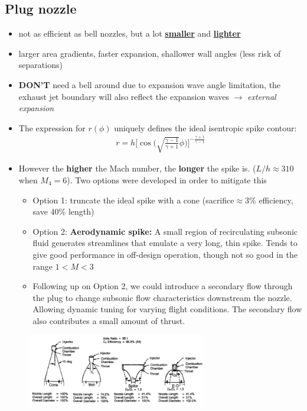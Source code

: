 \documentclass[a4paper,10pt]{article}
\begin{document}
\subsection{Plug nozzle}
\begin{itemize}
    \item not as efficient as bell nozzles, but a lot \underline{\textbf{smaller}} and \underline{\textbf{lighter}}
    \item larger area gradients, faster expansion, shallower wall angles (less risk of separations)
    \item \textbf{DON'T} need a bell around due to expansion wave angle limitation, the exhaust jet boundary will also reflect the expansion waves $\rightarrow$ \textit{external expansion} 
    \item The expression for $r(\phi)$ uniquely defines the ideal isentropic spike contour:
        \begin{gather*}
            r = h\Big[\cos\Big(\sqrt{\frac{\gamma-1}{\gamma+1}}\phi\Big)\Big]^{-\frac{\gamma+1}{\gamma-1}}
        \end{gather*}
    \item However the \textbf{higher} the Mach number, the \textbf{longer} the spike is. ($L/h\approx310$ when $M_4=6$). Two options were developed in order to mitigate this 
    \begin{itemize}
        \item Option 1: truncate the ideal spike with a cone (sacrifice$\approx$3\% efficiency, save 40\% length)
        \item Option 2: \textbf{Aerodynamic spike:} A small region of recirculating subsonic fluid generates streamlines that emulate a very long, thin spike. Tends to give good performance in off-design operation, though not so good in the range $1<M<3$
        \item Following up on Option 2, we could introduce a secondary flow through the plug to change subsonic flow characteristics downstream the nozzle. Allowing dynamic tuning for varying flight conditions. The secondary flow also contributes a small amount of thrust. 
    \end{itemize}
\end{itemize}

\begin{figure}[H]
    \centering
    \includegraphics[width=0.7\textwidth]{Figure/nozzles.png}
\end{figure}
\end{document}
